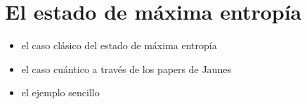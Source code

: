 \section{El estado de máxima entropía}
\begin{itemize}
\item el caso clásico del estado de máxima entropía
\item el caso cuántico a través de los papers de Jaunes
\item el ejemplo sencillo
\end{itemize}


